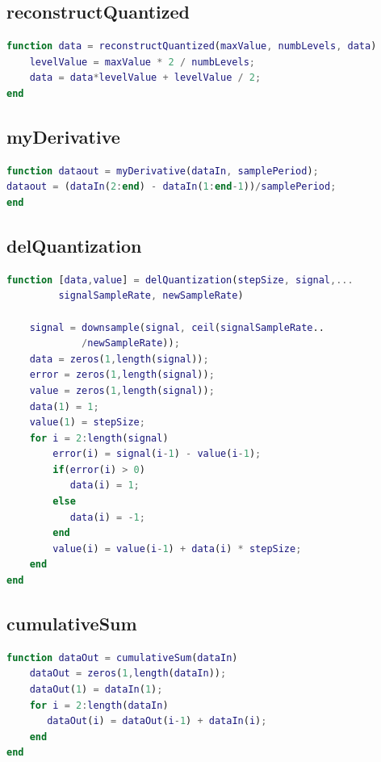 \documentclass{article}
\begin{document}
\subsection{reconstructQuantized}
\begin{lstlisting}[language = MATLAB]
function data = reconstructQuantized(maxValue, numbLevels, data)
    levelValue = maxValue * 2 / numbLevels;
    data = data*levelValue + levelValue / 2;
end
\end{lstlisting}
\subsection{myDerivative}
\begin{lstlisting}[language = MATLAB]
function dataout = myDerivative(dataIn, samplePeriod);
dataout = (dataIn(2:end) - dataIn(1:end-1))/samplePeriod;
end
\end{lstlisting}
\subsection{delQuantization}
\begin{lstlisting}[language = MATLAB]
function [data,value] = delQuantization(stepSize, signal,...
         signalSampleRate, newSampleRate)

    signal = downsample(signal, ceil(signalSampleRate..
             /newSampleRate));
    data = zeros(1,length(signal));
    error = zeros(1,length(signal));
    value = zeros(1,length(signal));
    data(1) = 1;
    value(1) = stepSize;
    for i = 2:length(signal)
        error(i) = signal(i-1) - value(i-1);
        if(error(i) > 0)
           data(i) = 1;
        else
           data(i) = -1;
        end
        value(i) = value(i-1) + data(i) * stepSize;
    end
end
\end{lstlisting}
\subsection{cumulativeSum}
\begin{lstlisting}[language = MATLAB]
function dataOut = cumulativeSum(dataIn)
    dataOut = zeros(1,length(dataIn));
    dataOut(1) = dataIn(1);
    for i = 2:length(dataIn)
       dataOut(i) = dataOut(i-1) + dataIn(i);
    end
end
\end{lstlisting}
\end{document}
